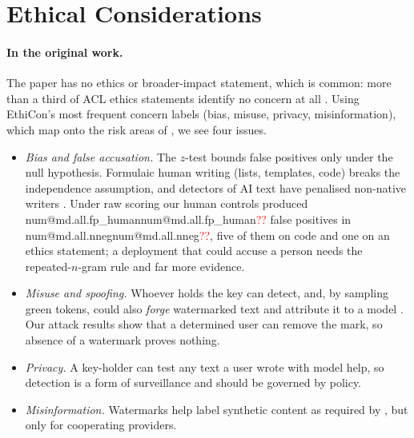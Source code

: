 \documentclass[11pt]{article}
\makeatletter
\newcommand{\V}[1]{\ifcsname num@#1\endcsname\csname num@#1\endcsname\else\textcolor{red}{??\detokenize{#1}}\fi}
\makeatother
\begin{document}
\section{Ethical Considerations}
\label{sec:ethics}

\paragraph{In the original work.}
The paper has no ethics or broader-impact statement, which is common: more than a third of ACL ethics statements identify no concern at all \citep{karamolegkou2025ethicon, benotti2022ethics}. Using EthiCon's most frequent concern labels (bias, misuse, privacy, misinformation), which map onto the risk areas of \citet{weidinger2021ethical}, we see four issues.
\begin{itemize}
\item \emph{Bias and false accusation.} The $z$-test bounds false positives only under the null hypothesis. Formulaic human writing (lists, templates, code) breaks the independence assumption, and detectors of AI text have penalised non-native writers \citep{liang2023detectors}. Under raw scoring our human controls produced \V{md.all.fp_human} false positives in \V{md.all.nneg}, five of them on code and one on an ethics statement; a deployment that could accuse a person needs the repeated-$n$-gram rule and far more evidence.
\item \emph{Misuse and spoofing.} Whoever holds the key can detect, and, by sampling green tokens, could also \emph{forge} watermarked text and attribute it to a model \citep{sadasivan2023detect}. Our attack results show that a determined user can remove the mark, so absence of a watermark proves nothing.
\item \emph{Privacy.} A key-holder can test any text a user wrote with model help, so detection is a form of surveillance and should be governed by policy.
\item \emph{Misinformation.} Watermarks help label synthetic content as required by \citet{euaiact2024}, but only for cooperating providers.
\end{itemize}
\end{document}

